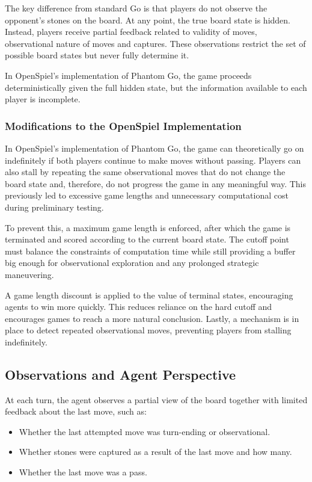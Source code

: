 \documentclass[12pt,oneside,openright]{article}
\begin{document}
The key difference from standard Go is that players do not observe the opponent's stones on the board. At any point, the true board state is hidden.
Instead, players receive partial feedback related to validity of moves, observational nature of moves and captures.
These observations restrict the set of possible board states but never fully determine it.

In OpenSpiel's implementation of Phantom Go, the game proceeds deterministically given the full hidden state, but the information available to each player is incomplete.

\subsubsection{Modifications to the OpenSpiel Implementation}
\label{sec:openspiel_mods}

In OpenSpiel's implementation of Phantom Go, the game can theoretically go on indefinitely if both players continue to make moves without passing.
Players can also stall by repeating the same observational moves that do not change the board state and, therefore, do not progress the game in any meaningful way. This previously led to excessive game lengths and unnecessary computational cost during preliminary testing.

To prevent this, a maximum game length is enforced, after which the game is terminated and scored according to the current board state.
The cutoff point must balance the constraints of computation time while still providing a buffer big enough for observational exploration and any prolonged strategic maneuvering.

A game length discount is applied to the value of terminal states, encouraging agents to win more quickly.
This reduces reliance on the hard cutoff and encourages games to reach a more natural conclusion.
Lastly, a mechanism is in place to detect repeated observational moves, preventing players from stalling indefinitely.



\subsection{Observations and Agent Perspective}

At each turn, the agent observes a partial view of the board together with limited feedback about the last move, such as:

\begin{itemize}
  \item Whether the last attempted move was turn-ending or observational.
  \item Whether stones were captured as a result of the last move and how many.
  \item Whether the last move was a pass.
\end{itemize}
\end{document}
